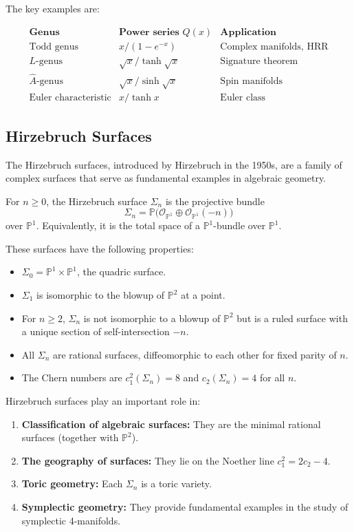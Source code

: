 The key examples are:

\[
\begin{array}{l|l|l}
\textbf{Genus} & \textbf{Power series } Q(x) & \textbf{Application}
\\ \hline
\text{Todd genus} & x/(1 - e^{-x}) & \text{Complex manifolds, HRR}
\\
L\text{-genus} & \sqrt{x}/\tanh\sqrt{x} & \text{Signature theorem}
\\
\hat{A}\text{-genus} & \sqrt{x}/\sinh\sqrt{x} & \text{Spin manifolds}
\\
\text{Euler characteristic} & x/\tanh x & \text{Euler class}
\end{array}
\]

\subsection{Hirzebruch Surfaces}

The Hirzebruch surfaces, introduced by Hirzebruch in the 1950s, are a
family of complex surfaces that serve as fundamental examples in
algebraic geometry.

\begin{definition}
For \(n \ge 0\), the Hirzebruch surface \(\Sigma_n\) is the projective
bundle
\[
\Sigma_n = \mathbb{P}\bigl(\mathcal{O}_{\mathbb{P}^1}
\oplus \mathcal{O}_{\mathbb{P}^1}(-n)\bigr)
\]
over \(\mathbb{P}^1\). Equivalently, it is the total space of a
\(\mathbb{P}^1\)-bundle over \(\mathbb{P}^1\).
\end{definition}

These surfaces have the following properties:
\begin{itemize}
    \item \(\Sigma_0 = \mathbb{P}^1 \times \mathbb{P}^1\), the quadric
    surface.
    \item \(\Sigma_1\) is isomorphic to the blowup of \(\mathbb{P}^2\)
    at a point.
    \item For \(n \ge 2\), \(\Sigma_n\) is not isomorphic to a blowup
    of \(\mathbb{P}^2\) but is a ruled surface with a unique section
    of self-intersection \(-n\).
    \item All \(\Sigma_n\) are rational surfaces, diffeomorphic to each
    other for fixed parity of \(n\).
    \item The Chern numbers are \(c_1^2(\Sigma_n) = 8\) and
    \(c_2(\Sigma_n) = 4\) for all \(n\).
\end{itemize}

Hirzebruch surfaces play an important role in:
\begin{enumerate}
    \item \textbf{Classification of algebraic surfaces:} They are the
    minimal rational surfaces (together with \(\mathbb{P}^2\)).
    \item \textbf{The geography of surfaces:} They lie on the Noether
    line \(c_1^2 = 2c_2 - 4\).
    \item \textbf{Toric geometry:} Each \(\Sigma_n\) is a toric variety.
    \item \textbf{Symplectic geometry:} They provide fundamental
    examples in the study of symplectic 4-manifolds.
\end{enumerate}

